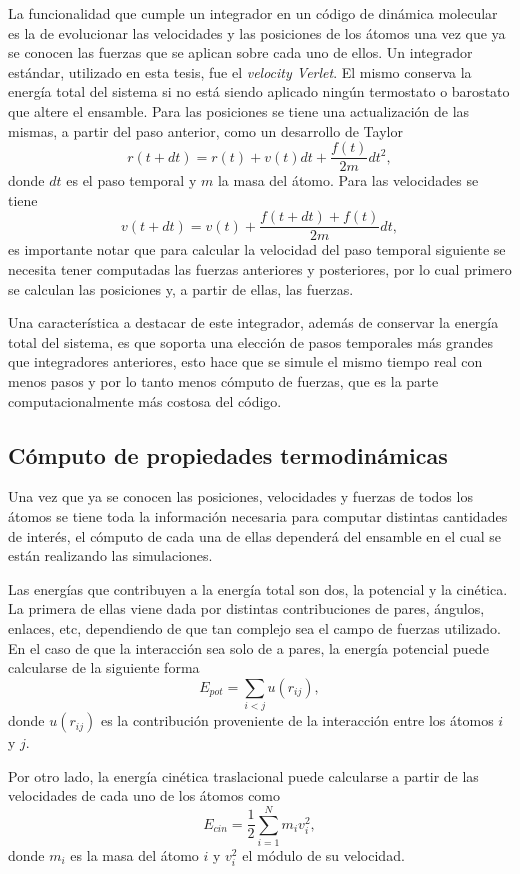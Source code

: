 La funcionalidad que cumple un integrador en un código de dinámica molecular es
la de evolucionar las velocidades y las posiciones de los átomos una vez que 
ya se conocen las fuerzas que se aplican sobre cada uno de ellos. Un integrador
estándar, utilizado en esta tesis, fue el \textit{velocity Verlet}. El mismo 
conserva la energía total del sistema si no está siendo aplicado ningún termostato
o barostato que altere el ensamble. Para las posiciones se tiene una
actualización de las mismas, a partir del paso anterior, como un desarrollo de
Taylor
$$
r(t+dt) = r(t) + v(t) dt + \frac{f(t)}{2m} dt^2,
$$
donde $dt$ es el paso temporal y $m$ la masa del átomo. Para las velocidades se
tiene
$$
v(t+dt) = v(t) + \frac{f(t+dt)+f(t)}{2m} dt,
$$
es importante notar que para calcular la velocidad del paso temporal siguiente se
necesita tener computadas las fuerzas anteriores y posteriores, por lo cual
primero se calculan las posiciones y, a partir de ellas, las fuerzas.

Una característica a destacar de este integrador, además de conservar la energía
total del sistema, es que soporta una elección de pasos temporales más grandes
que integradores anteriores, esto hace que se simule el mismo tiempo real con 
menos pasos y por lo tanto menos cómputo de fuerzas, que es la parte 
computacionalmente más costosa del código.

\subsection{Cómputo de propiedades termodinámicas}

Una vez que ya se conocen las posiciones, velocidades y fuerzas de todos los 
átomos se tiene toda la información necesaria para computar distintas
cantidades de interés, el cómputo de cada una de ellas dependerá del ensamble en
el cual se están realizando las simulaciones.

Las energías que contribuyen a la energía total son dos, la potencial y la
cinética. La primera de ellas viene dada por distintas contribuciones de pares, 
ángulos, enlaces, etc, dependiendo de que tan complejo sea el campo de fuerzas 
utilizado. En el caso de que la interacción sea solo de a pares, la energía 
potencial puede calcularse de la siguiente forma
$$
E_{pot} = \sum_{i < j} u(r_{ij}),
$$
donde $u(r_{ij})$ es la contribución proveniente de la interacción entre los 
átomos $i$ y $j$.

Por otro lado, la energía cinética traslacional puede calcularse a partir de las
velocidades de cada uno de los átomos como
$$
E_{cin} = \frac{1}{2} \sum_{i=1}^{N} m_i v_i^2, 
$$
donde $m_i$ es la masa del átomo $i$ y $v_i^2$ el módulo de su velocidad. 


